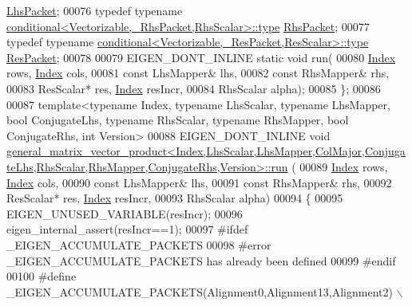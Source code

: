 \begin{DoxyCode}
       \hyperlink{class_eigen_1_1internal_1_1_tensor_lazy_evaluator_writable}{LhsPacket};
00076 \textcolor{keyword}{typedef} \textcolor{keyword}{typename} \hyperlink{class_eigen_1_1internal_1_1_tensor_lazy_evaluator_writable}{conditional<Vectorizable,\_RhsPacket,RhsScalar>::type}
       \hyperlink{class_eigen_1_1internal_1_1_tensor_lazy_evaluator_writable}{RhsPacket};
00077 \textcolor{keyword}{typedef} \textcolor{keyword}{typename} \hyperlink{class_eigen_1_1internal_1_1_tensor_lazy_evaluator_writable}{conditional<Vectorizable,\_ResPacket,ResScalar>::type}
       \hyperlink{class_eigen_1_1internal_1_1_tensor_lazy_evaluator_writable}{ResPacket};
00078 
00079 EIGEN\_DONT\_INLINE \textcolor{keyword}{static} \textcolor{keywordtype}{void} run(
00080   \hyperlink{namespace_eigen_a62e77e0933482dafde8fe197d9a2cfde}{Index} rows, \hyperlink{namespace_eigen_a62e77e0933482dafde8fe197d9a2cfde}{Index} cols,
00081   \textcolor{keyword}{const} LhsMapper& lhs,
00082   \textcolor{keyword}{const} RhsMapper& rhs,
00083         ResScalar* res, \hyperlink{namespace_eigen_a62e77e0933482dafde8fe197d9a2cfde}{Index} resIncr,
00084   RhsScalar alpha);
00085 \};
00086 
00087 \textcolor{keyword}{template}<\textcolor{keyword}{typename} Index, \textcolor{keyword}{typename} LhsScalar, \textcolor{keyword}{typename} LhsMapper, \textcolor{keywordtype}{bool} ConjugateLhs, \textcolor{keyword}{typename} RhsScalar, \textcolor{keyword}{
      typename} RhsMapper, \textcolor{keywordtype}{bool} ConjugateRhs, \textcolor{keywordtype}{int} Version>
00088 EIGEN\_DONT\_INLINE \textcolor{keywordtype}{void} 
      \hyperlink{struct_eigen_1_1internal_1_1general__matrix__vector__product}{
      general\_matrix\_vector\_product<Index,LhsScalar,LhsMapper,ColMajor,ConjugateLhs,RhsScalar,RhsMapper,ConjugateRhs,Version>::run}
      (
00089   \hyperlink{namespace_eigen_a62e77e0933482dafde8fe197d9a2cfde}{Index} rows, \hyperlink{namespace_eigen_a62e77e0933482dafde8fe197d9a2cfde}{Index} cols,
00090   \textcolor{keyword}{const} LhsMapper& lhs,
00091   \textcolor{keyword}{const} RhsMapper& rhs,
00092         ResScalar* res, \hyperlink{namespace_eigen_a62e77e0933482dafde8fe197d9a2cfde}{Index} resIncr,
00093   RhsScalar alpha)
00094 \{
00095   EIGEN\_UNUSED\_VARIABLE(resIncr);
00096   eigen\_internal\_assert(resIncr==1);
00097 \textcolor{preprocessor}{  #ifdef \_EIGEN\_ACCUMULATE\_PACKETS}
00098 \textcolor{preprocessor}{  #error \_EIGEN\_ACCUMULATE\_PACKETS has already been defined}
00099 \textcolor{preprocessor}{  #endif}
00100 \textcolor{preprocessor}{  #define \_EIGEN\_ACCUMULATE\_PACKETS(Alignment0,Alignment13,Alignment2) \(\backslash\)}

\end{DoxyCode}
